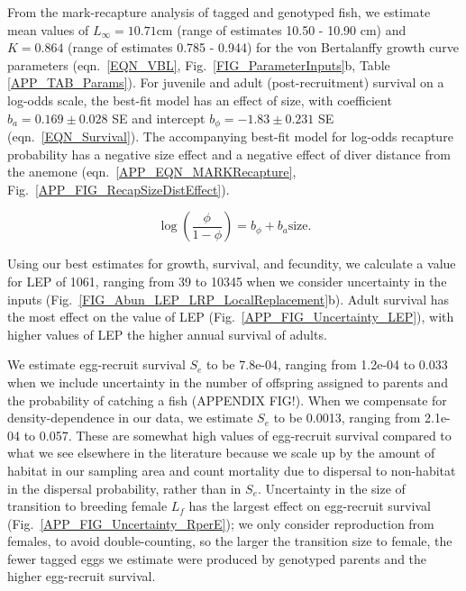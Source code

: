 \documentclass[12pt, oneside]{article}   	%
\begin{document}
From the mark-recapture analysis of tagged and genotyped fish, we estimate mean values of $L_\infty = 10.71 \text{cm}$ (range of estimates 10.50 - 10.90 cm) and $K = 0.864$ (range of estimates 0.785 - 0.944) for the von Bertalanffy growth curve parameters (eqn.\ \ref{EQN_VBL}, Fig.\ \ref{FIG_ParameterInputs}b, Table \ref{APP_TAB_Params}). For juvenile and adult (post-recruitment) survival on a log-odds scale, the best-fit model has an effect of size, with coefficient $b_a = 0.169 \pm 0.028$ SE and intercept $b_\phi = -1.83 \pm 0.231$ SE (eqn.\ \ref{EQN_Survival}). The accompanying best-fit model for log-odds recapture probability has a negative size effect and a negative effect of diver distance from the anemone (eqn.\ \ref{APP_EQN_MARKRecapture}, Fig.\ \ref{APP_FIG_RecapSizeDistEffect}).

\begin{equation}
\log(\frac{\phi}{1-\phi}) = b_\phi + b_a\text{size}. \label{EQN_Survival}
\end{equation}

Using our best estimates for growth, survival, and fecundity, we calculate a value for LEP of 1061, ranging from 39 to 10345 when we consider uncertainty in the inputs (Fig.\ \ref{FIG_Abun_LEP_LRP_LocalReplacement}b). Adult survival has the most effect on the value of LEP (Fig.\ \ref{APP_FIG_Uncertainty_LEP}), with higher values of LEP the higher annual survival of adults. 

We estimate egg-recruit survival $S_e$ to be 7.8e-04, ranging from 1.2e-04 to 0.033 when we include uncertainty in the number of offspring assigned to parents and the probability of catching a fish (APPENDIX FIG!). When we compensate for density-dependence in our data, we estimate $S_e$ to be 0.0013, ranging from 2.1e-04 to 0.057. These are somewhat high values of egg-recruit survival compared to what we see elsewhere in the literature \citep[e.g.][]{rumrill_natural_1990, metaxas_quantifying_2009} \citep[though not unreasonable, e.g.][]{white2014planktonic, johnson2018integrating} because we scale up by the amount of habitat in our sampling area and count mortality due to dispersal to non-habitat in the dispersal probability, rather than in $S_e$. Uncertainty in the size of transition to breeding female $L_f$ has the largest effect on egg-recruit survival (Fig.\ \ref{APP_FIG_Uncertainty_RperE}); we only consider reproduction from females, to avoid double-counting, so the larger the transition size to female, the fewer tagged eggs we estimate were produced by genotyped parents and the higher egg-recruit survival. %
\end{document}
